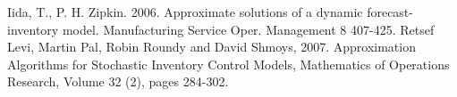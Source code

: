 \documentclass[twoside]{article}
\begin{document}
\begin{multicols}{2}

\begin{thebibliography}{99} %

Iida, T., P. H. Zipkin. 2006. Approximate solutions of a dynamic forecast-inventory model. Manufacturing Service Oper. Management
8 407-425.
Retsef Levi, Martin Pal, Robin Roundy and David Shmoys, 2007. Approximation Algorithms for Stochastic Inventory Control Models, Mathematics of Operations Research, Volume 32 (2), pages 284-302.

\end{thebibliography}


\end{multicols}
\end{document}
